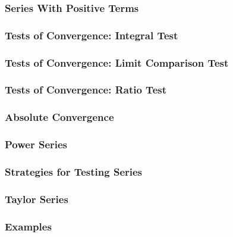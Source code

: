 \documentclass{beamer}
\begin{document}
\begin{frame}
\frametitle{Series With Positive Terms}

\end{frame}

\begin{frame}
\frametitle{Tests of Convergence: Integral Test}
\end{frame}

\begin{frame}
\frametitle{Tests of Convergence: Limit Comparison Test}
\end{frame}

\begin{frame}
\frametitle{Tests of Convergence: Ratio Test}
\end{frame}

\begin{frame}
\frametitle{Absolute Convergence}
\end{frame}

\begin{frame}
\frametitle{Power Series}
\end{frame}

\begin{frame}
\frametitle{Strategies for Testing Series}
\end{frame}

\begin{frame}
\frametitle{Taylor Series}
\end{frame}

\begin{frame}
\frametitle{Examples}
\end{frame}
\end{document}
